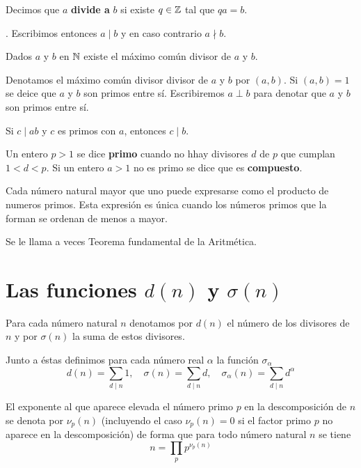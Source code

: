 \documentclass[TAN.tex]{subfiles}
\begin{document}
\begin{defi}
Decimos que $a$ \textbf{divide a} $b$ si existe $q \in \mathbb{Z}$ tal que $qa=b$.
\end{defi}.
Escribimos entonces $a \mid b$ y en caso contrario $a \nmid b$.

\begin{prop}
Dados $a$ y $b$ en $\mathbb{N}$ existe el máximo común divisor de $a$ y $b$.
\end{prop}

Denotamos el máximo común divisor divisor de $a$ y $b$ por $(a,b)$.
Si $(a,b) = 1$ se deice que $a$ y $b$ son primos entre sí.
Escribiremos $a \perp b$ para denotar que $a$ y $b$ son primos entre sí.

\begin{prop}
Si $c \mid ab$ y $c$ es primos con $a$, entonces $c \mid b$.
\end{prop}

\begin{defi}
Un entero $p > 1$ se dice \textbf{primo} cuando no hhay divisores $d$ de $p$ que cumplan $1 < d < p$.
Si un entero $a > 1$ no es primo se dice que es \textbf{compuesto}.
\end{defi}

\begin{teorema}
Cada número natural mayor que uno puede expresarse como el producto de numeros primos.
Esta expresión es única cuando los números primos que la forman se ordenan de menos a mayor.
\end{teorema}

Se le llama a veces Teorema fundamental de la Aritmética.


\section{Las funciones $d(n)$ y $σ(n)$}

\begin{defi}
Para cada número natural $n$ denotamos por $d(n)$ el número de los divisores de $n$ y por $σ(n)$ la suma de estos divisores.

Junto a éstas definimos para cada número real $α$ la función $σ_α$
\[ d(n) = \sum_{d\mid n} 1, \quad σ(n) = \sum_{d\mid n} d, \quad σ_α(n) = \sum_{d\mid n} d^α \]
\end{defi}

\begin{nota}
El exponente al que aparece elevada el número primo $p$ en la descomposición de $n$ se denota por $ν_p(n)$ (incluyendo el caso $ν_p(n)=0$ si el factor primo $p$ no aparece en la descomposición) de forma que para todo número natural $n$ se tiene
\[ n = \prod_p p^{ν_p(n)} \]
\end{nota}
\end{document}
